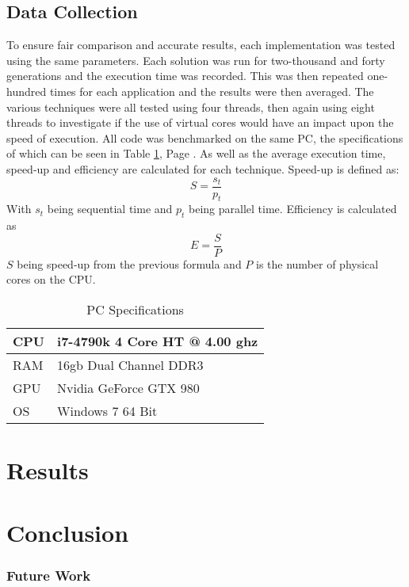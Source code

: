 \documentclass[journal,transmag]{IEEEtran}
\begin{document}
	\subsection{Data Collection}
		To ensure fair comparison and accurate results, each implementation was tested using the same parameters. Each solution was run for two-thousand and forty generations and the execution time was recorded. This was then repeated one-hundred times for each application and the results were then averaged. The various techniques were all tested using four threads, then again using eight threads to investigate if the use of virtual cores would have an impact upon the speed of execution. All code was benchmarked on the same PC, the specifications of which can be seen in Table \ref{pcSpecsTabel}, Page \pageref{pcSpecsTabel}. As well as the average execution time, speed-up and efficiency are calculated for each technique. Speed-up is defined as: 
		\[S=\frac{s_{t}}{p_{t}}\]
		With \(s_{t}\) being sequential time and \(p_{t}\) being parallel time.
		Efficiency is calculated as 
		\[E = \frac{S}{P}\]
		\(S\) being speed-up from the previous formula and \(P\) is the number of physical cores on the CPU.
		\begin{table}[]
			\centering
			\caption{PC Specifications}
			\label{pcSpecsTabel}
			\begin{tabular}{|l|l|}
				\hline
				CPU & i7-4790k 4 Core HT @ 4.00 ghz \\ \hline
				RAM & 16gb Dual Channel DDR3        \\ \hline
				GPU & Nvidia GeForce GTX 980        \\ \hline
				OS  & Windows 7 64 Bit              \\ \hline
			\end{tabular}
		\end{table}
		
	
	
\section{Results}
	
\section{Conclusion}
	
	\subsubsection{Future Work}
	
\appendices
\renewcommand\refname{Bibliography}


\nocite{Williams:1483005}
\end{document}
